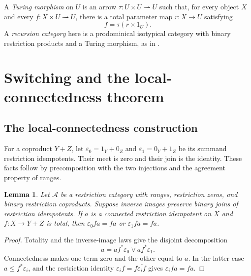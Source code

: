 \documentclass[11pt]{article}
\newtheorem{lemma}[theorem]{Lemma}
\begin{document}
A \emph{Turing morphism} on $U$ is an arrow
$\tau:U\times U\rightharpoonup U$ such that, for every object $X$
and every $f:X\times U\rightharpoonup U$, there is a total
parameter map $r:X\to U$ satisfying
\[
 f=\tau(r\times1_U).
\]
A \emph{recursion category} here is a prodominical isotypical
category with binary restriction products and a Turing morphism,
as in \cite[Section 9]{Heller}.

\section{Switching and the local-connectedness theorem}\label{sec:lifting}

\subsection{The local-connectedness construction}

For a coproduct $Y+Z$, let
$\varepsilon_0=1_Y+0_Z$ and $\varepsilon_1=0_Y+1_Z$ be its summand
restriction idempotents. Their meet is zero and their join is the identity. These facts
follow by precomposition with the two injections and the agreement
property of ranges.

\begin{lemma}\label{lem:connected-alternative}
Let $\mathcal A$ be a restriction category with ranges, restriction zeros,
and binary restriction coproducts. Suppose inverse images preserve binary
joins of restriction idempotents. If $a$ is a connected restriction
idempotent on $X$ and
$f:X\to Y+Z$ is total, then
$\varepsilon_0fa=fa$ or $\varepsilon_1fa=fa$.
\end{lemma}
\begin{proof}
Totality and the inverse-image laws give the disjoint decomposition
\[
 a=af^*\varepsilon_0\vee af^*\varepsilon_1.
\]
Connectedness makes one term zero and the other equal to $a$. In the
latter case $a\le f^*\varepsilon_i$, and the restriction identity
$\varepsilon_i f=f\overline{\varepsilon_i f}$ gives
$\varepsilon_i fa=fa$.
\end{proof}
\end{document}
